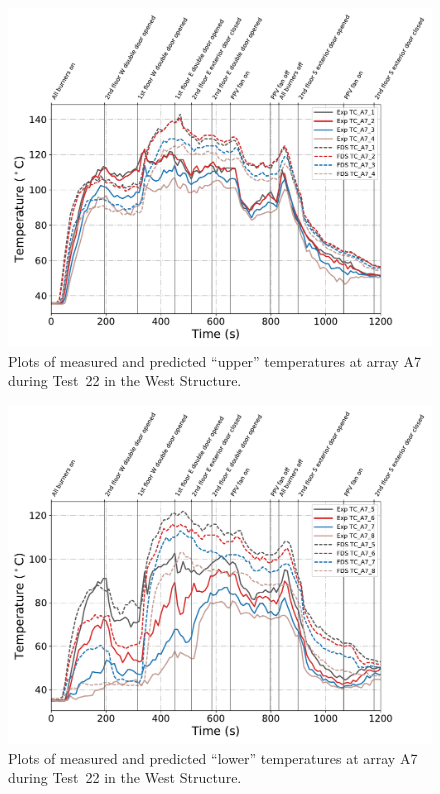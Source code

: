 \begin{figure}[!h]
	\centering
	\includegraphics[width=\columnwidth]{Figures/Plots/Validation/Temperature/Test_22_TC_A7_upper}
	\caption{Plots of measured and predicted ``upper'' temperatures at array A7 during Test~22 in the West Structure.}
	\label{fig:TCA7_upper_data_Test22}
\end{figure}
\begin{figure}[!h]
	\centering
	\includegraphics[width=\columnwidth]{Figures/Plots/Validation/Temperature/Test_22_TC_A7_lower}
	\caption{Plots of measured and predicted ``lower'' temperatures at array A7 during Test~22 in the West Structure.}
	\label{fig:TCA7_lower_data_Test22}
\end{figure}

